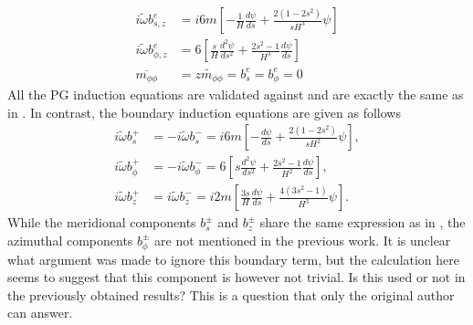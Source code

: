 \begin{equation}
\begin{aligned}
    i \widetilde{\omega} b_{s, z}^e &= i6m \left[- \frac{1}{H}\frac{d\psi}{d s} + \frac{2(1 - 2s^2)}{sH^3} \psi\right] \\
    i \widetilde{\omega} b_{\phi, z}^e &= 6\left[\frac{s}{H}\frac{d^{2}\psi}{d s^{2}} + \frac{2s^2 - 1}{H^3} \frac{d\psi}{d s} \right] \\
    \overline{m_{\phi\phi}} &= \widetilde{zm_{\phi\phi}} = b_{s}^e = b_{\phi}^e = 0
\end{aligned}
\end{equation}
All the PG induction equations are validated against and are exactly the same as in \textcite{holdenried-chernoff_long_2021}.
In contrast, the boundary induction equations are given as follows
\begin{equation}
\begin{aligned}\label{eqn:eigen-bound-poloidal-dipole}
    i \widetilde{\omega} b^{+}_{s} &= - i \widetilde{\omega} b^{-}_{s} = i 6m \left[-\frac{d\psi}{d s} + \frac{2(1 - 2s^2)}{sH^2} \psi\right], \\
    i \widetilde{\omega} b^{+}_{\phi} &= -i \widetilde{\omega} b^{-}_{\phi} = 6 \left[s \frac{d^{2}\psi}{d s^{2}} + \frac{2s^2 - 1}{H^2} \frac{d\psi}{d s} \right], \\ 
    i \widetilde{\omega} b^{+}_{z} &= i \widetilde{\omega} b^{-}_{z} = i2m \left[\frac{3 s}{H} \frac{d\psi}{d s} + \frac{4(3s^2 - 1)}{H^3} \psi \right].
\end{aligned}
\end{equation}
While the meridional components $b_s^{\pm}$ and $b_z^{\pm}$ share the same expression as in \textcite{holdenried-chernoff_long_2021}, the azimuthal components $b_\phi^{\pm}$ are not mentioned in the previous work.
It is unclear what argument was made to ignore this boundary term, but the calculation here seems to suggest that this component is however not trivial.
Is this used or not in the previously obtained results? This is a question that only the original author can answer.


